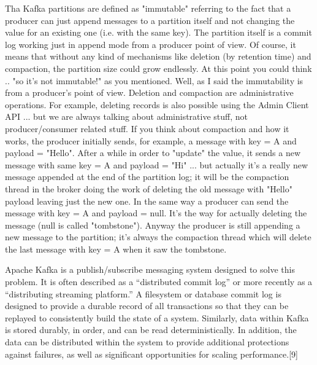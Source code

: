 \documentclass[12pt,twoside]{article}
\begin{document}
Tha Kafka partitions are defined as "immutable" referring to the fact that a producer can just append messages to a partition itself and not changing the value for an existing one (i.e. with the same key). The partition itself is a commit log working just in append mode from a producer point of view. Of course, it means that without any kind of mechanisms like deletion (by retention time) and compaction, the partition size could grow endlessly. At this point you could think .. "so it's not immutable!" as you mentioned. Well, as I said the immutability is from a producer's point of view. Deletion and compaction are administrative operations. For example, deleting records is also possible using the Admin Client API ... but we are always talking about administrative stuff, not producer/consumer related stuff.
If you think about compaction and how it works, the producer initially sends, for example, a message with key = A and payload = "Hello". After a while in order to "update" the value, it sends a new message with same key = A and payload = "Hi" ... but actually it's a really new message appended at the end of the partition log; it will be the compaction thread in the broker doing the work of deleting the old message with "Hello" payload leaving just the new one. In the same way a producer can send the message with key = A and payload = null. It's the way for actually deleting the message (null is called "tombstone"). Anyway the producer is still appending a new message to the partition; it's always the compaction thread which will delete the last message with key = A when it saw the tombstone.


Apache Kafka is a publish/subscribe messaging system designed to solve this problem. It is often described as a “distributed commit log” or more recently as a “distributing streaming platform.” A filesystem or database commit log is designed to provide a durable record of all transactions so that they can be replayed to consistently build the state of a system. Similarly, data within Kafka is stored durably, in order, and can be read deterministically. In addition, the data can be distributed within the system to provide additional protections against failures, as well as significant opportunities for scaling performance.[9]



\end{document}
